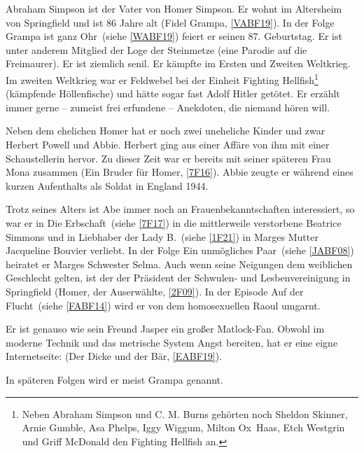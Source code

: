 Abraham Simpson ist der Vater von Homer Simpson. Er wohnt im Altersheim von Springfield und ist 86 Jahre alt (\glqq Fidel Grampa\grqq, \ref{VABF19}). In der Folge \glqq Grampa ist ganz Ohr\grqq\ (siehe \ref{WABF19}) feiert er seinen 87. Geburtstag. Er ist unter anderem Mitglied der Loge der Steinmetze (eine Parodie auf die Freimaurer). Er ist ziemlich senil. Er kämpfte im Ersten und Zweiten Weltkrieg. Im zweiten Weltkrieg war er Feldwebel bei der Einheit Fighting Hellfish\footnote{Neben Abraham Simpson und C. M. Burns gehörten noch Sheldon Skinner, Arnie Gumble, Asa Phelps, Iggy Wiggum, Milton \glqq Ox\grqq\ Haas, Etch Westgrin und Griff McDonald den Fighting Hellfish an.} (kämpfende Höllenfische) und hätte sogar fast Adolf Hitler getötet. Er erzählt immer gerne -- zumeist frei erfundene -- Anekdoten, die niemand hören will. 

Neben dem ehelichen Homer hat er noch zwei uneheliche Kinder und zwar Herbert Powell und Abbie. Herbert ging aus einer Affäre von ihm mit einer Schaustellerin hervor. Zu dieser Zeit war er bereits mit seiner späteren Frau Mona zusammen (\glqq Ein Bruder für Homer\grqq , \ref{7F16}). Abbie zeugte er während eines kurzen Aufenthalts als Soldat in England 1944.

Trotz seines Alters ist Abe immer noch an Frauenbekanntschaften interessiert, so war er in \glqq Die Erbschaft\grqq\ (siehe \ref{7F17}) in die mittlerweile verstorbene Beatrice Simmons und in \glqq Liebhaber der Lady B.\grqq\ (siehe \ref{1F21}) in Marges Mutter Jacqueline Bouvier verliebt. In der Folge \glqq Ein unmögliches Paar\grqq\ (siehe \ref{JABF08}) heiratet er Marges Schwester Selma. Auch wenn seine Neigungen dem weiblichen Geschlecht gelten, ist der der Präsident der Schwulen- und Lesbenvereinigung in Springfield (\glqq Homer, der Auserwählte\grqq , \ref{2F09}). In der Episode \glqq Auf der Flucht\grqq\ (siehe \ref{FABF14}) wird er von dem homosexuellen Raoul umgarnt.

Er ist genauso wie sein Freund Jasper ein großer Matlock-Fan. Obwohl im moderne Technik und das metrische System Angst bereiten, hat er eine eigne Internetseite: (\glqq Der Dicke und der Bär\grqq, \ref{EABF19}).

In späteren Folgen wird er meist Grampa genannt.


